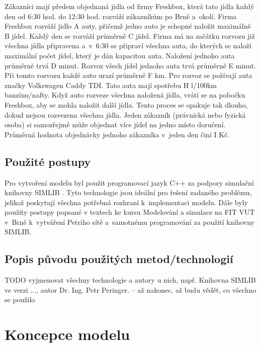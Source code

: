 \documentclass[a4paper, 11pt]{article}
\begin{document}
	Zákazníci mají předem objednaná jidla od firmy Freshbox, která tato jídla
	každý den od 6:30 hod. do 12:30 hod. rozváží zákazníkům po Brně a~okolí.
	Firma Freshbox rozváží jidlo A auty, přičemž jedno auto
	je schopné naložit  maximálně B jídel. Každý den se rozváží
	průměrně C jídel. Firma má na začátku rozvozu již všechna jídla
	připravena a~v~6:30 se připraví všechna auta, do kterých se naloží
	maximální počet jídel, který je dán kapacitou auta. Naložení jednoho
	auta průměrně trvá D minut. Rozvoz všech jídel jednoho auta
	trvá průměrně E minut. Při tomto rozvozu každé auto urazí
	průměrně F km. Pro rozvoz se požívají auta značky Volkswagen Caddy TDI.
	Tato auta mají spotřebu H l/100km banzínu/nafty. Když auto rozveze
	všechna naložená jídla, vrátí se na pobočku Freshbox, aby se mohla
	naložit další jídla. Tento proces se opakuje tak dlouho, dokud nejsou
	rozvezena všechna jídla. Jeden zákazník (právnická nebo fyzická osoba)
	si samozřejmě může objednat více jídel na jedno místo doručení.
	Průměrná hodnota objednávky jednoho zákazníka v~jeden den činí I Kč.


	\subsection{Použité postupy}

	Pro vytvoření modelu byl použit programovací jazyk C++ za podpory
	simulační knihovny SIMLIB \cite{SIMLIB}. Tyto technologie jsou ideální pro
	řešení zadaného problému, jelikož poskytují všechna potřebná rozhraní
	k~implementaci modelu. Dále byly použity postupy popsané v textech
	ke kursu Modelování a simulace na FIT VUT v~Brně \cite{IMS_slides}
	k~vytváření Petriho sítě \cite[snímek 123]{IMS_slides} a~samotnému
	programování za použití knihovny SIMLIB.


	\subsection{Popis původu použitých metod/technologií}

	TODO vyjmenovat všechny technologie a autory u nich, např.
	Knihovna SIMLIB ve verzi ..., autor Dr. Ing. Petr Peringer.
	-- až nakonec, až budu vědět, co všechno se použilo



	\section{Koncepce modelu}
\end{document}
